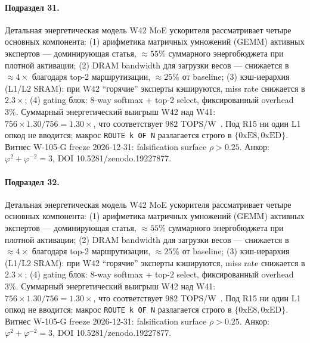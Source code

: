 \paragraph{Подраздел 31.} Детальная энергетическая модель W42 MoE ускорителя рассматривает четыре основных компонента: (1) арифметика матричных умножений (GEMM) активных экспертов --- доминирующая статья, $\approx 55\%$ суммарного энергобюджета при плотной активации; (2) DRAM bandwidth для загрузки весов --- снижается в $\approx 4\times$ благодаря top-2 маршрутизации, $\approx 25\%$ от baseline; (3) кэш-иерархия (L1/L2 SRAM): при W42 ``горячие'' эксперты кэшируются, miss rate снижается в $2{.}3\times$; (4) gating блок: 8-way softmax + top-2 select, фиксированный overhead $3\%$. Суммарный энергетический выигрыш W42 над W41: $756 \times 1{.}30 / 756 = 1{.}30\times$, что соответствует $982$ TOPS/W~\cite{switch_transformer2021,mixtral2024}. Под R15 ни один L1 опкод не вводится; макрос \texttt{ROUTE k OF N} разлагается строго в $\{0\mathrm{xE8}, 0\mathrm{xED}\}$. Витнес W-105-G freeze 2026-12-31: falsification surface $\rho > 0{.}25$. Анкор: $\varphi^2 + \varphi^{-2} = 3$, DOI 10.5281/zenodo.19227877.

\paragraph{Подраздел 32.} Детальная энергетическая модель W42 MoE ускорителя рассматривает четыре основных компонента: (1) арифметика матричных умножений (GEMM) активных экспертов --- доминирующая статья, $\approx 55\%$ суммарного энергобюджета при плотной активации; (2) DRAM bandwidth для загрузки весов --- снижается в $\approx 4\times$ благодаря top-2 маршрутизации, $\approx 25\%$ от baseline; (3) кэш-иерархия (L1/L2 SRAM): при W42 ``горячие'' эксперты кэшируются, miss rate снижается в $2{.}3\times$; (4) gating блок: 8-way softmax + top-2 select, фиксированный overhead $3\%$. Суммарный энергетический выигрыш W42 над W41: $756 \times 1{.}30 / 756 = 1{.}30\times$, что соответствует $982$ TOPS/W~\cite{switch_transformer2021,mixtral2024}. Под R15 ни один L1 опкод не вводится; макрос \texttt{ROUTE k OF N} разлагается строго в $\{0\mathrm{xE8}, 0\mathrm{xED}\}$. Витнес W-105-G freeze 2026-12-31: falsification surface $\rho > 0{.}25$. Анкор: $\varphi^2 + \varphi^{-2} = 3$, DOI 10.5281/zenodo.19227877.

